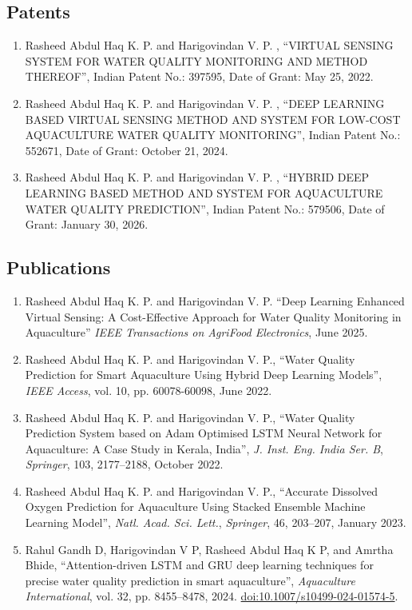 \documentclass[a4paper,10pt]{article}
\begin{document}
\subsection{Patents}
\begin{enumerate}
	\item {Rasheed Abdul Haq K. P. and Harigovindan V. P. }, \enquote{VIRTUAL SENSING SYSTEM FOR WATER QUALITY MONITORING AND METHOD THEREOF}, Indian Patent No.: 397595, Date of Grant: May 25, 2022.
	\item {Rasheed Abdul Haq K. P. and Harigovindan V. P. }, \enquote{DEEP LEARNING BASED VIRTUAL SENSING METHOD AND SYSTEM FOR LOW-COST AQUACULTURE WATER QUALITY MONITORING}, Indian Patent No.: 552671, Date of Grant: October 21, 2024.	
	\item {Rasheed Abdul Haq K. P. and Harigovindan V. P. }, \enquote{HYBRID DEEP LEARNING BASED METHOD AND SYSTEM FOR AQUACULTURE WATER QUALITY PREDICTION}, Indian Patent No.: 579506, Date of Grant: January 30, 2026.	
	
\end{enumerate}


\subsection{Publications}
\begin{enumerate}
	\item Rasheed Abdul Haq K. P. and Harigovindan V. P. \enquote{Deep Learning Enhanced Virtual Sensing: A Cost-Effective Approach for Water Quality Monitoring in Aquaculture} \textit{IEEE Transactions on AgriFood Electronics}, June 2025.
	\item Rasheed Abdul Haq K. P. and Harigovindan V. P., \enquote{Water Quality Prediction for Smart Aquaculture Using Hybrid Deep Learning Models}, \textit{IEEE Access}, vol. 10, pp. 60078-60098, June 2022. 
	\item Rasheed Abdul Haq K. P. and Harigovindan V. P., \enquote{Water Quality Prediction System based on Adam Optimised LSTM Neural Network for Aquaculture: A Case Study in Kerala, India}, \textit{J. Inst. Eng. India Ser. B}, \textit{Springer}, 103, 2177--2188, October 2022.    
	\item Rasheed Abdul Haq K. P. and Harigovindan V. P., \enquote{Accurate Dissolved Oxygen Prediction for Aquaculture Using Stacked Ensemble Machine Learning Model},  \textit{Natl. Acad. Sci. Lett.}, \textit{Springer}, 46, 203--207, January 2023. 
	\item Rahul Gandh D, Harigovindan V P, Rasheed Abdul Haq K P, and Amrtha Bhide, \enquote{Attention-driven LSTM and GRU deep learning techniques for precise water quality prediction in smart aquaculture}, \textit{Aquaculture International}, vol. 32, pp. 8455--8478, 2024. \href{https://doi.org/10.1007/s10499-024-01574-5}{doi:10.1007/s10499-024-01574-5}.
\end{enumerate}
\end{document}
